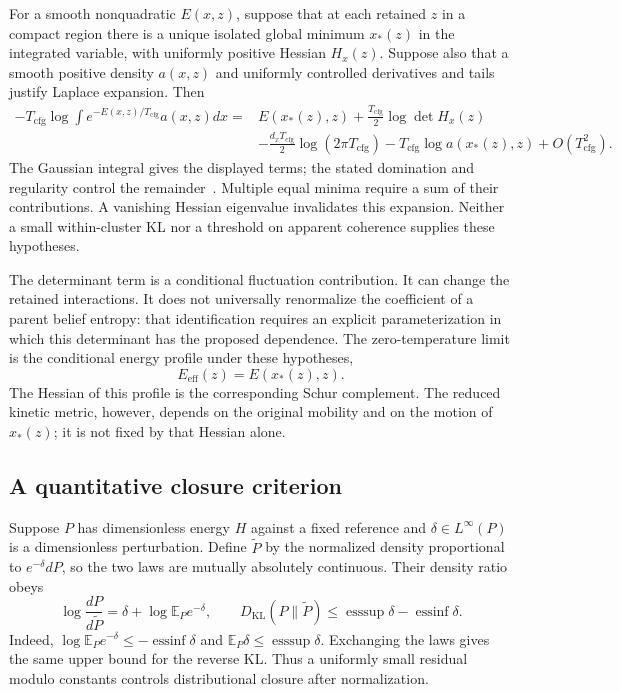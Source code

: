 For a smooth nonquadratic $E(x,z)$, suppose that at each retained $z$ in a compact region there is a unique isolated global minimum $x_*(z)$ in the integrated variable, with uniformly positive Hessian $H_x(z)$. Suppose also that a smooth positive density $a(x,z)$ and uniformly controlled derivatives and tails justify Laplace expansion. Then
\begin{equation}
\begin{split}
-T_{\mathrm{cfg}}\log\int e^{-E(x,z)/T_{\mathrm{cfg}}}a(x,z)dx
={}&E(x_*(z),z)+\frac{T_{\mathrm{cfg}}}{2}\log\det H_x(z)\\
&-\frac{d_xT_{\mathrm{cfg}}}{2}\log(2\pi T_{\mathrm{cfg}})
-T_{\mathrm{cfg}}\log a(x_*(z),z)+O(T_{\mathrm{cfg}}^2).
\end{split}
\label{eq:rg_laplace}
\end{equation}
The Gaussian integral gives the displayed terms; the stated domination and regularity control the remainder~\cite{wong2001asymptotic}. Multiple equal minima require a sum of their contributions. A vanishing Hessian eigenvalue invalidates this expansion. Neither a small within-cluster KL nor a threshold on apparent coherence supplies these hypotheses.

The determinant term is a conditional fluctuation contribution. It can change the retained interactions. It does not universally renormalize the coefficient of a parent belief entropy: that identification requires an explicit parameterization in which this determinant has the proposed dependence. The zero-temperature limit is the conditional energy profile under these hypotheses,
\begin{equation}
E_{\mathrm{eff}}(z)=E(x_*(z),z).
\label{eq:rg_zero_temperature_profile}
\end{equation}
The Hessian of this profile is the corresponding Schur complement. The reduced kinetic metric, however, depends on the original mobility and on the motion of $x_*(z)$; it is not fixed by that Hessian alone.

\subsection{A quantitative closure criterion}
Suppose $P$ has dimensionless energy $H$ against a fixed reference and $\delta\in L^\infty(P)$ is a dimensionless perturbation. Define $\widetilde P$ by the normalized density proportional to $e^{-\delta}dP$, so the two laws are mutually absolutely continuous. Their density ratio obeys
\begin{equation}
\log\frac{dP}{d\widetilde P}
=\delta+\log\mathbb E_Pe^{-\delta},
\qquad
D_{\mathrm{KL}}(P\|\widetilde P)
\leq \operatorname{esssup}\delta-\operatorname{essinf}\delta.
\label{eq:rg_closure}
\end{equation}
Indeed, $\log\mathbb E_Pe^{-\delta}\leq-\operatorname{essinf}\delta$ and $\mathbb E_P\delta\leq\operatorname{esssup}\delta$. Exchanging the laws gives the same upper bound for the reverse KL. Thus a uniformly small residual modulo constants controls distributional closure after normalization.

